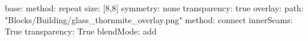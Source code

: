 base:
  method: repeat
  size: [8,8]
  symmetry: none
  transparency: true
overlay:
  path: "Blocks/Building/glass_thornmite_overlay.png"
  method: connect
  innerSeams: True
  transparency: True
blendMode: add
